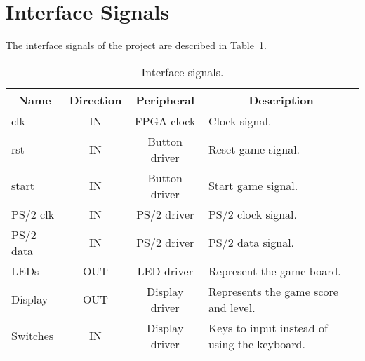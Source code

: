 \section{Interface Signals}
\label{sec:is}

The interface signals of the project are described in Table~\ref{tab:is}.

\begin{table}[h]
\centering
\begin{tabular}{|l|c|c|l|}
\hline
\multicolumn{1}{|c|}{\bf Name} & {\bf Direction} & {\bf Peripheral} & \multicolumn{1}{c|}{\bf Description} \\ 
\hline \hline
\multicolumn{1}{|l|}{clk}                & IN & FPGA clock & Clock signal.\\ 
\hline
\multicolumn{1}{|l|}{rst}                & IN & Button driver & Reset game signal.\\
\hline
\multicolumn{1}{|l|}{start}              & IN & Button driver & Start game signal.\\
\hline
\multicolumn{1}{|l|}{PS/2 clk}            & IN & PS/2 driver  & PS/2 clock signal.\\
\hline
\multicolumn{1}{|l|}{PS/2 data}           & IN & PS/2 driver & PS/2 data signal.\\
\hline
\multicolumn{1}{|l|}{LEDs}               & OUT & LED driver & Represent the game board.\\
\hline
\multicolumn{1}{|l|}{Display}            & OUT & Display driver & Represents the game score and level.\\
\hline
\multicolumn{1}{|l|}{Switches}            & IN & Display driver & Keys to input instead of using the keyboard. \\
\hline
\end{tabular}
\caption{Interface signals.}
\label{tab:is}
\end{table}

